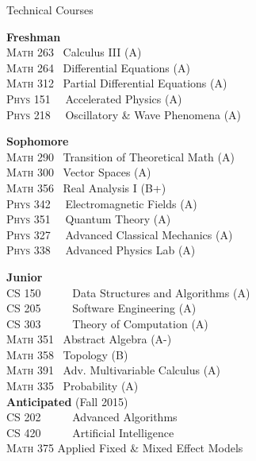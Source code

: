 \documentclass{resume} %
\begin{document}
\begin{rSection}{Technical Courses}


\setlength{\columnsep}{1cm}
\begin{multicols}{2}

\textbf{Freshman}\\
\textsc{Math 263} 	 \	Calculus III (A)\\
\textsc{Math 264} 	 \	Differential Equations (A)\\
\textsc{Math 312} 	 \	Partial Differential Equations (A)\\
\textsc{Phys 151} \  \	Accelerated Physics (A)\\
\textsc{Phys 218} \  \	Oscillatory \& Wave Phenomena (A)

\textbf{Sophomore}\\
\textsc{Math 290} 	 \	Transition of Theoretical Math (A)\\
\textsc{Math 300} 	 \	Vector Spaces (A)\\
\textsc{Math 356} 	 \	Real Analysis I (B+)\\
\textsc{Phys 342} \	 \	Electromagnetic Fields (A)\\
\textsc{Phys 351} \	 \	Quantum Theory (A)\\
\textsc{Phys 327} \	 \	Advanced Classical Mechanics (A)\\
\textsc{Phys 338} \	 \	Advanced Physics Lab (A)

\textbf{Junior}\\
\textsc{CS 150} \ \ \ \  \	Data Structures and Algorithms (A)\\
\textsc{CS 205} \ \ \ \	 \	Software Engineering (A)\\
\textsc{CS 303} \ \ \ \	 \	Theory of Computation (A)\\
\textsc{Math 351} 		 \	Abstract Algebra (A-)\\
\textsc{Math 358} 		 \	Topology (B)\\
\textsc{Math 391} 		 \	Adv. Multivariable Calculus (A)\\
\textsc{Math 335} 		 \	Probability (A)\\

\textbf{Anticipated} (Fall 2015)\\
\textsc{CS 202} \ \ \ \	 \	Advanced Algorithms\\
\textsc{CS 420} \ \ \ \	 \	Artificial Intelligence\\
\textsc{Math 375} 		 Applied Fixed \& Mixed Effect Models\\


\end{multicols}

\end{rSection}
\end{document}
